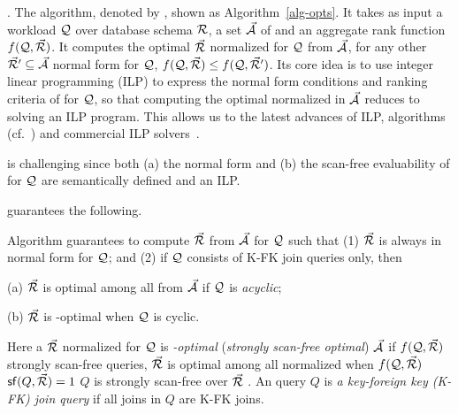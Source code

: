 .
The  algorithm, denoted by \opts,
 shown as
Algorithm~\ref{alg-opts}. It takes as input a workload $\mathcal Q$ over
database schema ${\mathcal R}$, a set $\vec{{\mathcal A}}$ of \bss and an aggregate rank
function $f(\mathcal Q,\allowbreak \vec{{\mathcal R}})$.
It computes the optimal \bds $\vec{{\mathcal R}}$ normalized for $\mathcal Q$ from $\vec{{\mathcal A}}$,
\ie for any other \bds $\vec{{\mathcal R}}'\allowbreak \subseteq \allowbreak \vec{{\mathcal A}}$ 
normal form for $\mathcal Q$, $f(\mathcal Q,\allowbreak \vec{{\mathcal R}})\allowbreak \leq\allowbreak f(\mathcal Q,\allowbreak \vec{{\mathcal R}}')$.
%
Its core idea is to use integer linear programming (ILP) to
express the normal form conditions and ranking criteria of \bdss
for $\mathcal Q$, so that computing the optimal normalized \bds in $\vec{{\mathcal A}}$
reduces to solving an ILP program. This allows us to 
 the latest advances of ILP, \eg algorithms
(cf.~\cite{ILPbook}) and commercial ILP
solvers~\cite{cplex,gurobi,XpressMP}. 



is challenging since both (a) the normal form and (b) the
scan-free evaluability of \bdss for $\mathcal Q$ are semantically defined
and   an ILP.

\vspace{1ex}
 \opts guarantees the following. 

\vspace{-0.3ex}
\begin{theorem}\label{thm-opts}
Algorithm \opts guarantees to compute $\vec{{\mathcal R}}$ from $\vec{{\mathcal A}}$
for $\mathcal Q$ such that
(1) $\vec{{\mathcal R}}$ is always in  normal form for $\mathcal Q$; and
(2) if $\mathcal Q$ consists of K-FK join \SPC queries only, then
\bi
\item[(a)] $\vec{{\mathcal R}}$ is optimal among all \bdss from $\vec{{\mathcal A}}$
  if $\mathcal Q$ is {\em acyclic}; 
\item[(b)] $\vec{{\mathcal R}}$ is \ssf-optimal when $\mathcal Q$ is cyclic. 
\ei
\vspace{-3.5ex}
\end{theorem}

Here a \bds $\vec{{\mathcal R}}$ normalized for $\mathcal Q$ is {\em \ssf-optimal}
({\em strongly scan-free optimal}) \wrt $\vec{{\mathcal A}}$ if $f(\mathcal Q, \vec{{\mathcal R}})$
 strongly scan-free queries, \ie $\vec{{\mathcal R}}$ is optimal
among all normalized \bdss when $f(\mathcal Q, \vec{{\mathcal R}})$  ${\mathsf{sf}}(Q,\allowbreak \vec{{\mathcal R}}) \allowbreak = \allowbreak 1$  $Q$ is strongly scan-free over $\vec{{\mathcal R}}$
.
An \SPC
query $Q$ is {\em a key-foreign key (K-FK) join query} if all joins in
$Q$ are K-FK joins.

